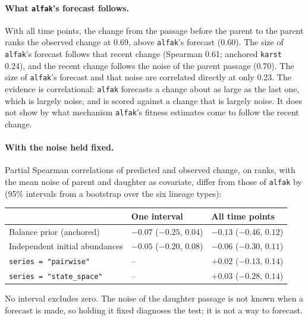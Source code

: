 \documentclass[11pt]{article}
\begin{document}
\paragraph{What \texttt{alfak}'s forecast follows.} With all time points, the
change from the passage before the parent to the parent ranks the observed
change at 0.69, above \texttt{alfak}'s forecast (0.60). The size of
\texttt{alfak}'s forecast follows that recent change (Spearman 0.61; anchored
\texttt{karst} 0.24), and the recent change follows the noise of the parent
passage (0.70). The size of \texttt{alfak}'s forecast and that noise are
correlated directly at only 0.23. The evidence is correlational:
\texttt{alfak} forecasts a change about as large as the last one, which is
largely noise, and is scored against a change that is largely noise. It does
not show by what mechanism \texttt{alfak}'s fitness estimates come to follow
the recent change.

\paragraph{With the noise held fixed.} Partial Spearman correlations of
predicted and observed change, on ranks, with the mean noise of parent and
daughter as covariate, differ from those of \texttt{alfak} by (95\%
intervals from a bootstrap over the six lineage types):

\begin{center}
\begin{tabular}{L{0.42\textwidth}L{0.22\textwidth}L{0.22\textwidth}}
\toprule
 & One interval & All time points \\
\midrule
Balance prior (anchored) & $-0.07$ ($-0.25$, $0.04$) & $-0.13$ ($-0.46$, $0.12$) \\
Independent initial abundances & $-0.05$ ($-0.20$, $0.08$) & $-0.06$ ($-0.30$, $0.11$) \\
\texttt{series = "pairwise"} & -- & $+0.02$ ($-0.13$, $0.14$) \\
\texttt{series = "state\_space"} & -- & $+0.03$ ($-0.28$, $0.14$) \\
\bottomrule
\end{tabular}
\end{center}

No interval excludes zero. The noise of the daughter passage is not known when
a forecast is made, so holding it fixed diagnoses the test; it is not a way to
forecast.
\end{document}

